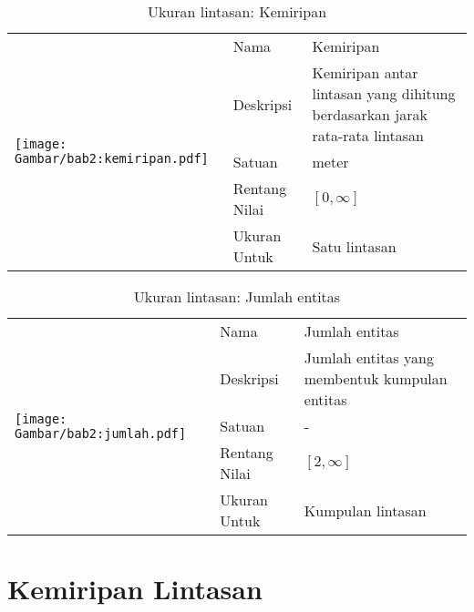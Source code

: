 \begin{table}[h!]
    \centering
    \caption{Ukuran lintasan: Kemiripan}
    \begin{tabular}{|m{4cm}|l|p{8.5cm}|} 
        \hline
        \multirow{5}{*}{
            \texttt{[image: Gambar/bab2:kemiripan.pdf]}
        } & Nama & Kemiripan \\ 
        \cline{2-3}
        & Deskripsi & Kemiripan antar lintasan yang dihitung berdasarkan jarak rata-rata lintasan                     \\ 
        \cline{2-3}
        & Satuan & meter                   \\ 
        \cline{2-3}
        & Rentang Nilai & $[0, \infty]$                    \\ 
        \cline{2-3}
        & Ukuran Untuk & Satu lintasan                    \\
        \hline
    \end{tabular}
\end{table}

\begin{table}[h!]
    \centering
    \caption{Ukuran lintasan: Jumlah entitas}
    \begin{tabular}{|m{4cm}|l|p{8.5cm}|} 
        \hline
        \multirow{5}{*}{
            \texttt{[image: Gambar/bab2:jumlah.pdf]}
        } & Nama & Jumlah entitas \\ 
        \cline{2-3}
        & Deskripsi & Jumlah entitas yang membentuk kumpulan entitas                     \\ 
        \cline{2-3}
        & Satuan & -                   \\ 
        \cline{2-3}
        & Rentang Nilai & $[2, \infty]$                    \\ 
        \cline{2-3}
        & Ukuran Untuk & Kumpulan lintasan                    \\
        \hline
    \end{tabular}
\end{table}

\section{Kemiripan Lintasan}
\label{sec:kemiripan}

